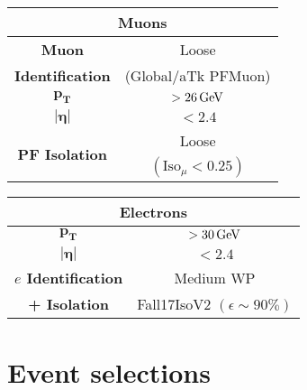\begin{minipage}{\linewidth}
    \vspace{-0.5cm}
    \begin{minipage}{0.47\linewidth}
        \begin{table}[H]
        \centering
        \begin{tabular}{c|c}
            \toprule
            \multicolumn{2}{c}{\textbf{Muons}}\\
            \midrule
            \midrule
            \textbf{Muon} & Loose\\
            \textbf{Identification}& (Global/aTk PFMuon)\\
            \midrule
            $\mathbf{p_T}$& $>26 {\,\text{Ge\hspace{-.08em}V}}$\\
            \midrule
            $\bm{|\eta|}$& $<2.4$ \\
            \midrule
            \multirow{2}{*}{\textbf{PF Isolation}}&Loose\\
            &$(\text{Iso}_\mu<0.25)$\\
            \bottomrule
        \end{tabular}
    \end{table}
        
    \end{minipage}
    \hfill
    \begin{minipage}{0.47\linewidth}
        \begin{table}[H]
            \centering
            \renewcommand{\arraystretch}{1.48}
            \begin{tabular}{c|c}
                \toprule
                \multicolumn{2}{c}{\textbf{Electrons}}\\
                \midrule
                \midrule
                $\mathbf{p_T}$& $>30 {\,\text{Ge\hspace{-.08em}V}}$\\
                \midrule
                $\bm{|\eta|}$& $<2.4$ \\
                \midrule
                \textbf{$e$ Identification}&Medium WP\\
                \textbf{+ Isolation}&Fall17IsoV2 $(\epsilon \sim 90\%)$\\
                \bottomrule
            \end{tabular}
        \end{table}      
    \end{minipage}
\end{minipage}




\newpage
\section{Event selections}
